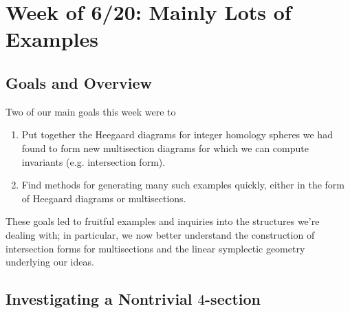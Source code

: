 \section{Week of 6/20: Mainly Lots of Examples}

\subsection*{Goals and Overview}
Two of our main goals this week were to
\begin{enumerate}
	\item Put together the Heegaard diagrams for integer homology spheres we had found to form new multisection diagrams for which we can compute invariants (e.g. intersection form).
	\item Find methods for generating many such examples quickly, either in the form of Heegaard diagrams or multisections.
\end{enumerate}

These goals led to fruitful examples and inquiries into the structures we're dealing with; in particular, we now better understand the construction of intersection forms for multisections and the linear symplectic geometry underlying our ideas.

\subsection{Investigating a Nontrivial $4$-section}

